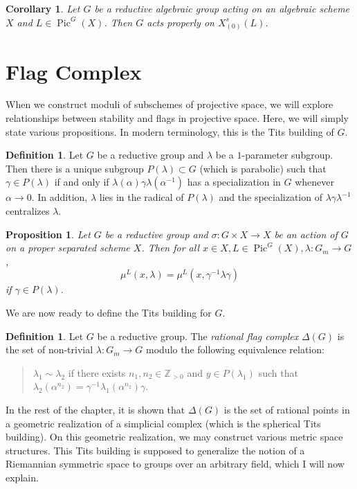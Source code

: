 \documentclass[leqno, openany]{memoir}
\newtheorem{cor}[thm]{Corollary}
\newtheorem{prop}[thm]{Proposition}
\theoremstyle{definition}
\newtheorem{defn}[thm]{Definition}
\theoremstyle{remark}
\theoremstyle{plain}
\theoremstyle{definition}
\theoremstyle{remark}
\newcommand{\Z}{\mathbb{Z}}
\DeclareMathOperator{\Pic}{Pic}
\begin{document}
\begin{cor}
    Let $G$ be a reductive algebraic group acting on an algebraic scheme $X$ and $L \in \Pic^G(X)$. Then $G$ acts properly on $X^s_{(0)}(L)$.
\end{cor}

\section{Flag Complex}%
\label{sec:flag_complex}

When we construct moduli of subschemes of projective space, we will explore relationships between stability and flags in projective space. Here, we will simply state various propositions. In modern terminology, this is the Tits building of $G$.

\begin{defn}
    Let $G$ be a reductive group and $\lambda$ be a $1$-parameter subgroup. Then there is a unique subgroup $P(\lambda) \subset G$ (which is parabolic) such that $ \gamma \in P(\lambda)$ if and only if $\lambda(\alpha) \gamma \lambda(\alpha^{-1})$ has a specialization in $G$ whenever $\alpha \to 0$. In addition, $\lambda$ lies in the radical of $P(\lambda)$ and the specialization of $\lambda \gamma \lambda^{-1}$ centralizes $\lambda$.
\end{defn}

\begin{prop}
    Let $G$ be a reductive group and $\sigma \colon G \times X \to X$ be an action of $G$ on a proper separated scheme $X$. Then for all $x \in X, L \in \Pic^G(X), \lambda \colon G_m \to G$, 
    \[ \mu^L(x, \lambda) = \mu^L(x, \gamma^{-1} \lambda \gamma) \]
    if $\gamma \in P(\lambda)$.
\end{prop}

We are now ready to define the Tits building for $G$.
\begin{defn}
    Let $G$ be a reductive group. The \textit{rational flag complex} $\Delta(G)$ is the set of non-trivial $\lambda \colon G_m \to G$ modulo the following equivalence relation:
    \begin{quotation}
    $\lambda_1 \sim \lambda_2$ if there exists $n_1, n_2 \in \Z_{>0}$ and $y \in P(\lambda_1)$ such that $\lambda_2(\alpha^{n_2}) = \gamma^{-1} \lambda_1(\alpha^{n_2}) \gamma$.
    \end{quotation}
\end{defn}

In the rest of the chapter, it is shown that $\Delta(G)$ is the set of rational points in a geometric realization of a simplicial complex (which is the spherical Tits building). On this geometric realization, we may construct various metric space structures. This Tits building is supposed to generalize the notion of a Riemannian symmetric space to groups over an arbitrary field, which I will now explain.
\end{document}
